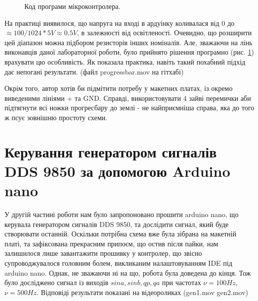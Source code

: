 \begin{figure}[h]
\caption{Код програми мікроконтролера.}
\label{fig:code1}
\end{figure}

На практиці виявилося, що напруга на вході в ардуінку коливалася від $0$ до $\approx 100/1024 * 5 V \approx 0.5 V$, в залежності від освітленості. Очевидно, що розширити цей діапазон можна підбором резисторів інших номіналів. Але, зважаючи на лінь виконавців даної лабораторної роботи, було прийнято рішення програмно (рис. \ref{fig:code1}) врахувати цю особливість. Як показала практика, навіть такий похабний підхід дає непогані результати. (файл progressbar.mov на гітхабі)

Окрім того, автор хотів би підмітити потребу у макетних платах, із окремо виведеними лініями + та GND. Справді, використовувати 4 зайві перемички аби підтягнути всі ножки прогресбару до землі - не найприємніша справа, яка до того ж псує зовнішню простоту схеми.

\section{Керування генератором сигналів DDS 9850 за допомогою Arduino nano}

У другій частині роботи нам було запропоновано прошити arduino nano, що керувала генератором сигналів DDS 9850, та дослідити сигнал, який буде створювати останній. Оскільки потрібна схема вже була зібрана на макетній платі, та зафіксована прекрасним припоєм, що остив після пайки, нам залишилося лише завантажити прошивку у контролер, що звісно супроводжувалося головним болем, викликаним налаштовуванням IDE під arduino nano. Однак, не зважаючи ні на що, робота була доведена до кінця. Тож було досліджено сигнал із виходів $sina,sinb,qp,qa$ при частотах $\nu = 100 Hz$, $\nu = 500 Hz$. Відповіді результати показані на відеороликах (gen1.mov gen2.mov)